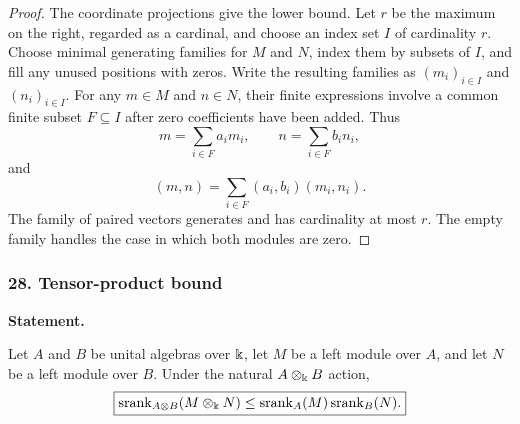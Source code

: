 \begin{proof}
The coordinate projections give the lower bound. Let $r$ be the maximum on the right, regarded as a cardinal, and choose an index set $I$ of cardinality $r$. Choose minimal generating families for $M$ and $N$, index them by subsets of $I$, and fill any unused positions with zeros. Write the resulting families as $(m_i)_{i\in I}$ and $(n_i)_{i\in I}$. For any $m\in M$ and $n\in N$, their finite expressions involve a common finite subset $F\subseteq I$ after zero coefficients have been added. Thus
\[
m=\sum_{i\in F}a_im_i,
\qquad
n=\sum_{i\in F}b_in_i,
\]
and
\[
(m,n)=\sum_{i\in F}(a_i,b_i)(m_i,n_i).
\]
The family of paired vectors generates and has cardinality at most $r$. The empty family handles the case in which both modules are zero.
\end{proof}
\subsubsection*{28. Tensor-product bound}
\label{rec:PSC-I-P-TENSOR-BOUND}
\textbf{Statement.}\par
Let $A$ and $B$ be unital algebras over $\Bbbk$, let $M$ be a left module over $A$, and let $N$ be a left module over $B$.  Under the natural $A\otimes_{\Bbbk}B$ action,
\[
\boxed{
\operatorname{srank}_{A\otimes B}(M\otimes_{\Bbbk}N)
\leq
\operatorname{srank}_A(M)\operatorname{srank}_B(N).
}
\]

